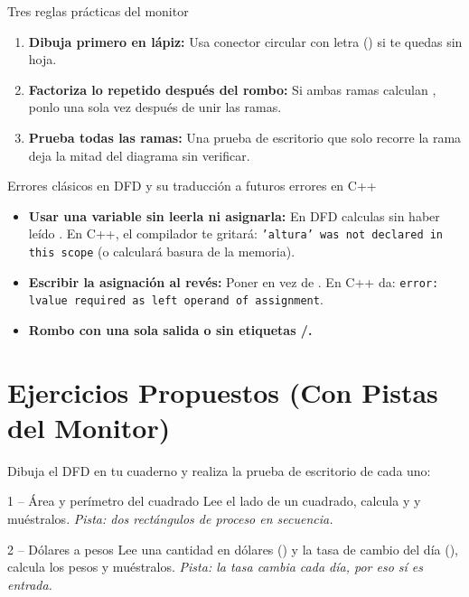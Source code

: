 \documentclass[11pt,letterpaper]{article}
\begin{document}
\begin{consejo}{Tres reglas prácticas del monitor}
\begin{enumerate}
  \item \textbf{Dibuja primero en lápiz:} Usa conector circular con letra () si te quedas sin hoja.
  \item \textbf{Factoriza lo repetido después del rombo:} Si ambas ramas calculan , ponlo una sola vez después de unir las ramas.
  \item \textbf{Prueba todas las ramas:} Una prueba de escritorio que solo recorre la rama  deja la mitad del diagrama sin verificar.
\end{enumerate}
\end{consejo}

\begin{peligro}{Errores clásicos en DFD y su traducción a futuros errores en C++}
\begin{itemize}
  \item \textbf{Usar una variable sin leerla ni asignarla:} En DFD calculas  sin haber leído . En C++, el compilador te gritará: \texttt{'altura' was not declared in this scope} (o calculará basura de la memoria).
  \item \textbf{Escribir la asignación al revés:} Poner  en vez de . En C++ da: \texttt{error: lvalue required as left operand of assignment}.
  \item \textbf{Rombo con una sola salida o sin etiquetas /.}
\end{itemize}
\end{peligro}

\section{Ejercicios Propuestos (Con Pistas del Monitor)}

Dibuja el DFD en tu cuaderno y realiza la prueba de escritorio de cada uno:

\begin{ejercicio}{1 -- Área y perímetro del cuadrado}
Lee el lado  de un cuadrado, calcula  y  y muéstralos. \textit{Pista: dos rectángulos de proceso en secuencia.}
\end{ejercicio}

\begin{ejercicio}{2 -- Dólares a pesos}
Lee una cantidad en dólares () y la tasa de cambio del día (), calcula los pesos y muéstralos. \textit{Pista: la tasa cambia cada día, por eso sí es entrada.}
\end{ejercicio}
\end{document}
